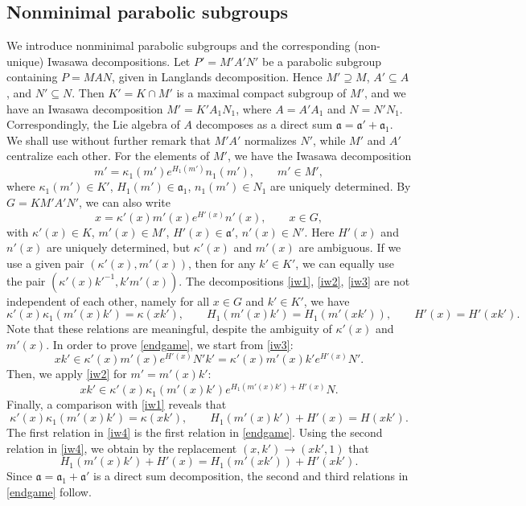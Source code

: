 \documentclass[11pt,oneside]{amsart}
\numberwithin{equation}{section}
\theoremstyle{remark}
\theoremstyle{plain}
\newcommand\mfa{\mathfrak{a}}
\begin{document}
\subsection{Nonminimal parabolic subgroups} 
We introduce nonminimal parabolic subgroups and the corresponding (non-unique) Iwasawa decompositions. Let $P'=M'A'N'$ be a parabolic subgroup containing $P=MAN$, given in Langlands decomposition. Hence $M'\supseteq M$, $A'\subseteq A$, and $N'\subseteq N$. Then $K'=K\cap M'$ is a maximal compact subgroup of $M'$, and we have an Iwasawa decomposition $M'=K'A_1N_1$, where $A=A'A_1$ and $N=N'N_1$. Correspondingly, the Lie algebra of $A$ decomposes as a direct sum $\mfa=\mfa'+\mfa_1$. We shall use without further remark that $M'A'$ normalizes $N'$, while $M'$ and $A'$ centralize each other. For the elements of $M'$, we have the Iwasawa decomposition
\begin{equation}\label{iw2}
m'=\kappa_1(m')e^{H_1(m')}n_1(m'),\qquad m'\in M',
\end{equation}
where $\kappa_1(m')\in K'$, $H_1(m')\in\mfa_1$, $n_1(m')\in N_1$ are uniquely determined. By $G=KM'A'N'$, we can also write
\begin{equation}\label{iw3}
x=\kappa'(x)m'(x)e^{H'(x)}n'(x),\qquad x\in G,
\end{equation}
with $\kappa'(x)\in K$, $m'(x)\in M'$, $H'(x)\in\mfa'$, $n'(x)\in N'$. Here $H'(x)$ and $n'(x)$ are uniquely determined, but $\kappa'(x)$ and $m'(x)$ are ambiguous. If we use a given pair $(\kappa'(x),m'(x))$, then for any $k'\in K'$, we can equally use the pair $(\kappa'(x)k'^{-1},k'm'(x))$. The decompositions \eqref{iw1}, \eqref{iw2}, \eqref{iw3} are not independent of each other, namely for all $x\in G$ and $k'\in K'$, we have
\begin{equation}\label{endgame}
\kappa'(x)\kappa_1(m'(x)k')=\kappa(xk'),\qquad H_1(m'(x)k')=H_1(m'(xk')),\qquad H'(x)=H'(xk').
\end{equation}
Note that these relations are meaningful, despite the ambiguity of $\kappa'(x)$ and $m'(x)$. In order to prove \eqref{endgame}, we start from \eqref{iw3}:
\[xk'\in\kappa'(x)m'(x)e^{H'(x)}N'k'=\kappa'(x)m'(x)k'e^{H'(x)}N'.\]
Then, we apply \eqref{iw2} for $m'=m'(x)k'$:
\[xk'\in\kappa'(x)\kappa_1(m'(x)k')e^{H_1(m'(x)k')+H'(x)}N.\]
Finally, a comparison with \eqref{iw1} reveals that
\begin{equation}\label{iw4}
\kappa'(x)\kappa_1(m'(x)k')=\kappa(xk'),\qquad H_1(m'(x)k')+H'(x)=H(xk').
\end{equation}
The first relation in \eqref{iw4} is the first relation in \eqref{endgame}. Using the second relation in \eqref{iw4}, we obtain by the replacement $(x,k')\to (xk',1)$ that
\[H_1(m'(x)k')+H'(x)=H_1(m'(xk'))+H'(xk').\]
Since $\mfa=\mfa_1+\mfa'$ is a direct sum decomposition, the second and third relations in \eqref{endgame} follow.
\end{document}

